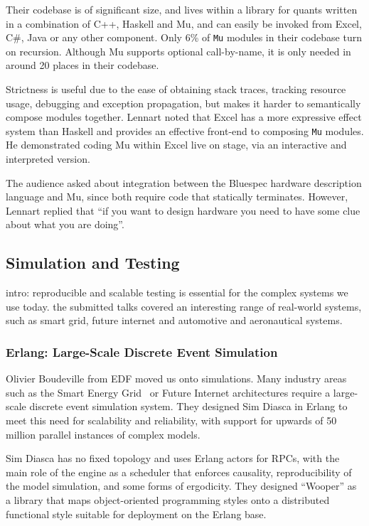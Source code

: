 \documentclass{jfp1}
\begin{document}
Their codebase is of significant size, and lives within a library for quants
written in a combination of C++, Haskell and Mu, and can easily be invoked from
Excel, C\#, Java or any other component. Only 6\% of {\tt Mu} modules in their
codebase turn on recursion. Although Mu supports optional call-by-name, it is
only needed in around 20 places in their codebase.

Strictness is useful due to the ease of obtaining stack traces, tracking
resource usage, debugging and exception propagation, but makes it harder to
semantically compose modules together.  Lennart noted that Excel has a more
expressive effect system than Haskell and provides an effective front-end to
composing {\tt Mu} modules. He demonstrated coding Mu within Excel live on stage,
via an interactive and interpreted version.

The audience asked about integration between the Bluespec hardware description
language and Mu, since both require code that statically terminates. However,
Lennart replied that ``if you want to design hardware you need to have some
clue about what you are doing''.

\subsection{Simulation and Testing}

intro: reproducible and scalable testing is essential for the complex systems we use today. the submitted talks covered an interesting range of real-world systems, such as smart grid, future internet and automotive and aeronautical systems.

\subsubsection{Erlang: Large-Scale Discrete Event Simulation}

Olivier Boudeville from EDF moved us onto simulations. Many industry areas such
as the Smart Energy Grid~\cite{x} or Future Internet architectures require a
large-scale discrete event simulation system. They designed Sim Diasca in
Erlang to meet this need for scalability and reliability, with support for
upwards of 50 million parallel instances of complex models.

Sim Diasca has no fixed topology and uses Erlang actors for RPCs, with the main
role of the engine as a scheduler that enforces causality, reproducibility of
the model simulation, and some forms of ergodicity. They designed ``Wooper'' as
a library that maps object-oriented programming styles onto a distributed
functional style suitable for deployment on the Erlang base.
\end{document}
